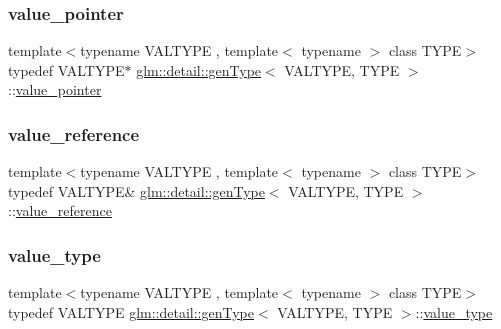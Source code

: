 \mbox{\label{structglm_1_1detail_1_1gen_type_a3b272e7be29ab920f2877c00646f6f9b}} 
\subsubsection{\texorpdfstring{value\+\_\+pointer}{value\_pointer}}
{\footnotesize\ttfamily template$<$typename V\+A\+L\+T\+Y\+PE , template$<$ typename $>$ class T\+Y\+PE$>$ \\
typedef V\+A\+L\+T\+Y\+PE$\ast$ \hyperlink{structglm_1_1detail_1_1gen_type}{glm\+::detail\+::gen\+Type}$<$ V\+A\+L\+T\+Y\+PE, T\+Y\+PE $>$\+::\hyperlink{structglm_1_1detail_1_1gen_type_a3b272e7be29ab920f2877c00646f6f9b}{value\+\_\+pointer}}

\mbox{\label{structglm_1_1detail_1_1gen_type_a557d18598a777df9f16fa1bd7c637ca4}} 
\subsubsection{\texorpdfstring{value\+\_\+reference}{value\_reference}}
{\footnotesize\ttfamily template$<$typename V\+A\+L\+T\+Y\+PE , template$<$ typename $>$ class T\+Y\+PE$>$ \\
typedef V\+A\+L\+T\+Y\+PE\& \hyperlink{structglm_1_1detail_1_1gen_type}{glm\+::detail\+::gen\+Type}$<$ V\+A\+L\+T\+Y\+PE, T\+Y\+PE $>$\+::\hyperlink{structglm_1_1detail_1_1gen_type_a557d18598a777df9f16fa1bd7c637ca4}{value\+\_\+reference}}

\mbox{\label{structglm_1_1detail_1_1gen_type_ad59e126a45bca74a36732a30cdaee520}} 
\subsubsection{\texorpdfstring{value\+\_\+type}{value\_type}}
{\footnotesize\ttfamily template$<$typename V\+A\+L\+T\+Y\+PE , template$<$ typename $>$ class T\+Y\+PE$>$ \\
typedef V\+A\+L\+T\+Y\+PE \hyperlink{structglm_1_1detail_1_1gen_type}{glm\+::detail\+::gen\+Type}$<$ V\+A\+L\+T\+Y\+PE, T\+Y\+PE $>$\+::\hyperlink{structglm_1_1detail_1_1gen_type_ad59e126a45bca74a36732a30cdaee520}{value\+\_\+type}}



